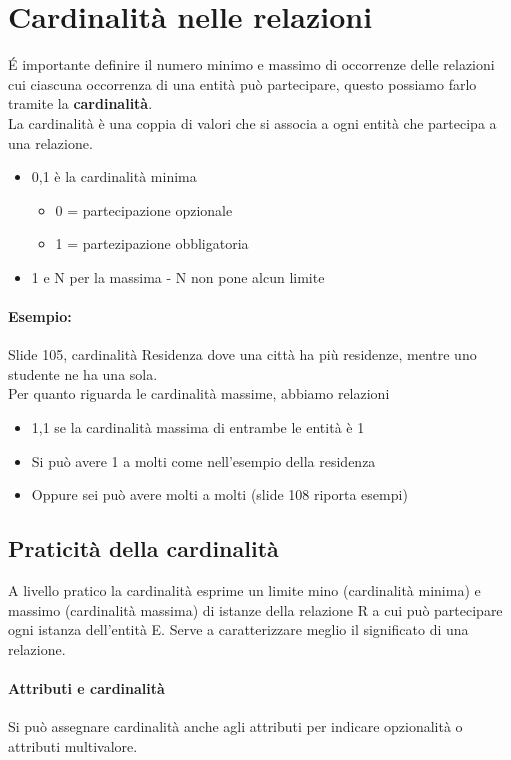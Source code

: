 \section{Cardinalità nelle relazioni}
\'E importante definire il numero minimo e massimo di occorrenze delle relazioni cui
ciascuna occorrenza di una entità può partecipare, questo possiamo farlo tramite
la \textbf{cardinalità}.
\\ La cardinalità è una coppia di valori che si associa a ogni entità che partecipa a una
relazione.
\begin{itemize}
    \item 0,1 è la cardinalità minima \begin{itemize}
        \item 0 = partecipazione opzionale
        \item 1 = partezipazione obbligatoria
    \end{itemize}
    \item 1 e N per la massima - N non pone alcun limite
\end{itemize}
\paragraph*{Esempio:} Slide 105, cardinalità Residenza dove una città ha più residenze,
mentre uno studente ne ha una sola.
\\ Per quanto riguarda le cardinalità massime, abbiamo relazioni
\begin{itemize}
    \item 1,1 se la cardinalità massima di entrambe le entità è 1
    \item Si può avere 1 a molti come nell'esempio della residenza
    \item Oppure sei può avere molti a molti (slide 108 riporta esempi)
\end{itemize}
\subsection*{Praticità della cardinalità}
A livello pratico la cardinalità esprime un limite mino (cardinalità minima)
e massimo (cardinalità massima) di istanze della relazione R a cui può partecipare
ogni istanza dell'entità E. Serve a caratterizzare meglio il significato di una relazione.
\paragraph*{Attributi e cardinalità} Si può assegnare cardinalità anche agli attributi
per indicare opzionalità o attributi multivalore.
